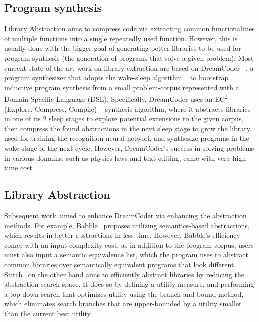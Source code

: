 

\subsection{Program synthesis}
Library Abstraction aims to compress code via extracting common functionalities of multiple functions into a single repeatedly used function. However, this is usually done with the bigger goal of generating better libraries to be used for program synthesis (the generation of programs that solve a given problem). Most current state-of-the art work on library extraction are based on DreamCoder ~\cite{ellis2020dreamcoder}, a program synthesizer that adopts the wake-sleep algorithm ~\cite{wake-sleep} to bootstrap inductive program synthesis from a small problem-corpus represented with a Domain Specific Language (DSL). Specifically, DreamCoder uses an EC\textsuperscript{2} (Explore, Compress, Compile) ~\cite{EC2} synthesis algorithm, where it abstracts libraries in one of its 2 sleep stages to explore potential extensions to the given corpus, then compress the found abstractions in the next sleep stage to grow the library used for training the recognition neural network and synthesize programs in the wake stage of the next cycle. However, DreamCoder's success in solving problems in various domains, such as physics laws and text-editing, came with very high time cost. 

\subsection{Library Abstraction}
Subsequent work aimed to enhance DreamCoder via enhancing the abstraction methods. For example, Babble~\cite{Cao_2023babble} proposes utilizing semantics-based abstractions, which results in better abstractions in less time. However, Babble's efficiency comes with an input complexity cost, as in addition to the program corpus, users must also input a semantic equivalence list, which the program uses to abstract common libraries over semantically equivalent programs that look different. Stitch~\cite{Bowers_2023stitch} on the other hand aims to efficiently abstract libraries by reducing the abstraction search space. It does so by defining a utility measure, and performing a top-down search that optimizes utility using the branch and bound method, which eliminates search branches that are upper-bounded by a utility smaller than the current best utility. 

